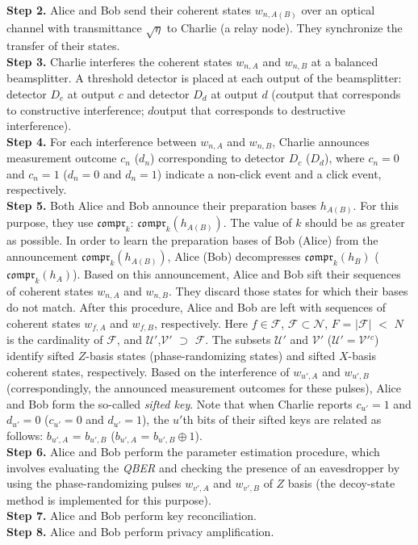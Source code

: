 \documentclass[journal,onecolumn]{IEEEtran}
\theoremstyle{thmstyleone}%
\theoremstyle{thmstyletwo}%
\theoremstyle{thmstylethree}%
\begin{document}
	\textbf{Step 2.} Alice and Bob send their coherent states $w_{n,A(B)}$  over an optical channel with transmittance $\sqrt{\eta}$ to Charlie (a relay node). They synchronize the transfer of their states.         \\
	\textbf{Step 3.} Charlie interferes the coherent states $w_{n,A}$ and $w_{n,B}$ at a balanced beamsplitter. A threshold detector is placed at each output of the beamsplitter: detector $D_c$ at output $c$ and detector $D_d$ at output $d$ ($c$\textemdash output that corresponds to constructive interference; $d$\textemdash output that corresponds to destructive interference).        \\
	\textbf{Step 4.} For each interference between $w_{n,A}$ and $w_{n,B}$, Charlie announces measurement outcome $c_n$ ($d_n$) corresponding to detector $D_c$ ($D_d$), where $c_n = \text{0}$ and $c_n = \text{1}$ ($d_n = \text{0}$ and $d_n = \text{1}$) indicate a non-click event and a click event, respectively.          \\ 
	\textbf{Step 5.} Both Alice and Bob announce their preparation bases $h_{A(B)}$. For this purpose, they use $\mathfrak{compr}_k$: $\mathfrak{compr}_k(h_{A(B)})$. The value of $k$ should be as greater as possible. In order to learn the preparation bases of Bob (Alice) from the announcement $\mathfrak{compr}_k(h_{A(B)})$, Alice (Bob) decompresses $\mathfrak{compr}_k(h_{B})$ ($\mathfrak{compr}_k(h_{A})$). Based on this announcement, Alice and Bob sift their sequences of coherent states $w_{n,A}$ and $w_{n,B}$. They discard those states for which their bases do not match. After this procedure, Alice and Bob are left with sequences of coherent states $w_{f,A}$ and $w_{f,B}$, respectively. Here $f\in\mathcal{F}$, $\mathcal{F}\subset\mathcal{N}$, $F$ = $|\mathcal{F}|$ $<$ $N$ is the cardinality of $\mathcal{F}$, and $\mathcal{U'}$,$\mathcal{V'}$ $\supset$ $\mathcal{F}$. The subsets $\mathcal{U'}$ and $\mathcal{V'}$ ($\mathcal{U'}=\mathcal{V'}$$^c$) identify sifted $Z$-basis states (phase-randomizing states) and sifted $X$-basis coherent states, respectively. Based on the interference of $w_{u',A}$ and $w_{u',B}$ (correspondingly, the announced measurement outcomes for these pulses), Alice and Bob form the so-called \textit{sifted key}. Note that when Charlie reports $c_{u'} = \text{1}$ and $d_{u'} = \text{0}$ ($c_{u'} = \text{0}$ and $d_{u'} = \text{1}$), the $u'$th bits of their sifted keys are related as follows: $b_{u',A}$ = $b_{u',B}$ ($b_{u',A}$ = $b_{u',B}\oplus\text{1}$).\\
	\textbf{Step 6.} Alice and Bob perform the parameter estimation procedure, which involves evaluating the \textit{QBER} and checking the presence of an eavesdropper by using the phase-randomizing pulses $w_{v',A}$ and $w_{v',B}$ of $Z$ basis (the decoy-state method is implemented for this purpose).       \\
	\textbf{Step 7.} Alice and Bob perform key reconciliation. \\
	\textbf{Step 8.} Alice and Bob perform privacy amplification.
	
\end{document}

